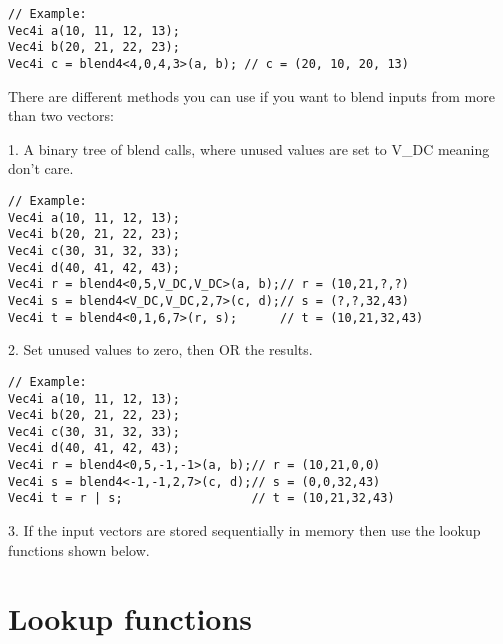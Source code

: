 \documentclass[vcl_manual.tex]{subfiles}
\begin{document}
\begin{lstlisting}[frame=none]
// Example:
Vec4i a(10, 11, 12, 13);
Vec4i b(20, 21, 22, 23);
Vec4i c = blend4<4,0,4,3>(a, b); // c = (20, 10, 20, 13)
\end{lstlisting}

There are different methods you can use if you want to blend inputs from more than two vectors: 

1. A binary tree of blend calls, where unused values are set to V\_DC meaning don't care.
\begin{lstlisting}[frame=none]
// Example:
Vec4i a(10, 11, 12, 13);
Vec4i b(20, 21, 22, 23);
Vec4i c(30, 31, 32, 33);
Vec4i d(40, 41, 42, 43);
Vec4i r = blend4<0,5,V_DC,V_DC>(a, b);// r = (10,21,?,?)
Vec4i s = blend4<V_DC,V_DC,2,7>(c, d);// s = (?,?,32,43)
Vec4i t = blend4<0,1,6,7>(r, s);      // t = (10,21,32,43)
\end{lstlisting}

2. Set unused values to zero, then OR the results.
\begin{lstlisting}[frame=none]
// Example:
Vec4i a(10, 11, 12, 13);
Vec4i b(20, 21, 22, 23);
Vec4i c(30, 31, 32, 33);
Vec4i d(40, 41, 42, 43);
Vec4i r = blend4<0,5,-1,-1>(a, b);// r = (10,21,0,0)
Vec4i s = blend4<-1,-1,2,7>(c, d);// s = (0,0,32,43)
Vec4i t = r | s;                  // t = (10,21,32,43)
\end{lstlisting}

3. If the input vectors are stored sequentially in memory then use the lookup functions shown below.


\section{Lookup functions}\label{LookupFunctions}
\end{document}
